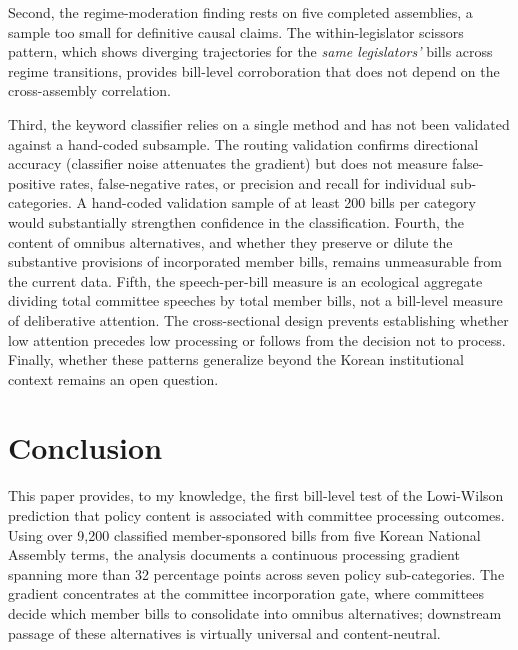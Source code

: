 \documentclass[11pt]{article}
\begin{document}
Second, the regime-moderation finding rests on five completed assemblies, a sample too small for definitive causal claims. The within-legislator scissors pattern, which shows diverging trajectories for the \emph{same legislators'} bills across regime transitions, provides bill-level corroboration that does not depend on the cross-assembly correlation.

Third, the keyword classifier relies on a single method and has not been validated against a hand-coded subsample. The routing validation confirms directional accuracy (classifier noise attenuates the gradient) but does not measure false-positive rates, false-negative rates, or precision and recall for individual sub-categories. A hand-coded validation sample of at least 200 bills per category would substantially strengthen confidence in the classification. Fourth, the content of omnibus alternatives, and whether they preserve or dilute the substantive provisions of incorporated member bills, remains unmeasurable from the current data. Fifth, the speech-per-bill measure is an ecological aggregate dividing total committee speeches by total member bills, not a bill-level measure of deliberative attention. The cross-sectional design prevents establishing whether low attention precedes low processing or follows from the decision not to process. Finally, whether these patterns generalize beyond the Korean institutional context remains an open question.



\section{Conclusion}
\label{sec:conclusion}

This paper provides, to my knowledge, the first bill-level test of the Lowi-Wilson prediction that policy content is associated with committee processing outcomes. Using over 9,200 classified member-sponsored bills from five Korean National Assembly terms, the analysis documents a continuous processing gradient spanning more than 32 percentage points across seven policy sub-categories. The gradient concentrates at the committee incorporation gate, where committees decide which member bills to consolidate into omnibus alternatives; downstream passage of these alternatives is virtually universal and content-neutral.
\end{document}
